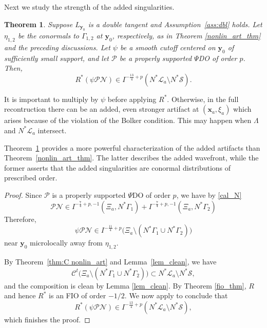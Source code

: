 \documentclass[11pt]{article}
\newcommand{\be}{\begin{equation}}
\newcommand{\ee}{\end{equation}}
\newcommand{\s}{\mathcal S}
\newcommand{\CL}{\mathcal L}
\newcommand{\CP}{\mathcal P}
\numberwithin{equation}{section}
\newcommand{\vy}{\mathbf{y}}
\newcommand{\vx}{\mathbf{x}}
\newcommand{\Cc}{\mathcal{C}}
\newtheorem{theorem}{Theorem}[section]
\theoremstyle{definition}
\begin{document}
Next we study the strength of the added singularities.


\begin{theorem}\label{thm:precise}
Suppose $L_{\vy_0}$ is a double tangent and Assumption~\ref{ass:dbl} holds. Let $\eta_{1,2}$ be the conormals to $\Gamma_{1,2}$ at $\vy_0$, respectively, as in Theorem \ref{nonlin_art_thm} and the preceding discussions. Let $\psi$ be a smooth cutoff centered on $\vy_0$ of sufficiently small support, and let $\CP$ be a properly supported $\Psi$DO of order $p$. Then,
\be\label{R* conorm}
R^* (\psi \CP\mathcal{N}) \in I^{-\frac{13}{4} + p}(N^*\CL_a\setminus N^*\s).
\ee
\end{theorem}

It is important to multiply by $\psi$ before applying $R^*$. Otherwise, in the full recontruction there can be an added, even stronger artifact at $(\vx_a,\xi_a)$ which arises because of the violation of the Bolker condition. This may happen when $\Lambda$ and $N^*\CL_a$ intersect.


Theorem~\ref{thm:precise} provides a more powerful characterization of the added artifacts than Theorem~\ref{nonlin_art_thm}. The latter describes the added wavefront, while the former asserts that the added singularities are conormal distributions of prescribed order. 

\begin{proof}
Since $\CP$ is a properly supported $\Psi$DO of order $p$, we have by \eqref{cal_N}
\be
\mathcal{P} \mathcal{N}\in I^{-\frac74 + p,-1}(\Xi_a, N^*\Gamma_1) + I^{-\frac74 + p,-1}(\Xi_a, N^*\Gamma_2)
\ee
Therefore,
\be
\psi\mathcal{P}\mathcal{N}\in I^{-\frac{11}4 + p}\big(\Xi_a\setminus (N^*\Gamma_1 \cup N^*\Gamma_2)\big)
\ee
near $\vy_0$ microlocally away from $\eta_{1,2}$.

By Theorem~\ref{thm:C nonlin_art} and Lemma~\ref{lem_clean}, we have
\be
\Cc^t \big(\Xi_a\setminus (N^*\Gamma_1 \cup N^*\Gamma_2)\big) \subset N^*\CL_a\setminus N^*\s,
\ee
and the composition is clean by Lemma \ref{lem_clean}. By Theorem \ref{fio_thm}, $R$ and hence $R^*$ is an FIO of order $-1/2$. We now apply \cite[Chapter VIII, Theorem 5.2]{trev2} to conclude that
\be
R^*(\psi\mathcal{P}\mathcal{N})\in I^{-\frac{13}4 + p}(N^*\CL_a\setminus N^*\s),
\ee
which finishes the proof. \end{proof}
\end{document}
